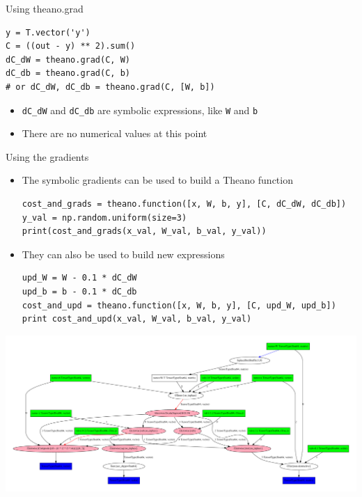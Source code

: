 \documentclass[a4paper,9pt]{beamer}
\begin{document}
\begin{frame}[fragile]{Using theano.grad}
  \begin{verbatim}
y = T.vector('y')
C = ((out - y) ** 2).sum()
dC_dW = theano.grad(C, W)
dC_db = theano.grad(C, b)
# or dC_dW, dC_db = theano.grad(C, [W, b])
  \end{verbatim}
  \begin{itemize}
    \item \verb|dC_dW| and \verb|dC_db| are symbolic expressions, like \verb|W| and \verb|b|
    \item There are no numerical values at this point
  \end{itemize}
\end{frame}

\begin{frame}[fragile]{Using the gradients}
  \begin{itemize}
    \item The symbolic gradients can be used to build a Theano function
      \begin{verbatim}
cost_and_grads = theano.function([x, W, b, y], [C, dC_dW, dC_db])
y_val = np.random.uniform(size=3)
print(cost_and_grads(x_val, W_val, b_val, y_val))
      \end{verbatim}
    \item They can also be used to build new expressions
      \begin{verbatim}
upd_W = W - 0.1 * dC_dW
upd_b = b - 0.1 * dC_db
cost_and_upd = theano.function([x, W, b, y], [C, upd_W, upd_b])
print cost_and_upd(x_val, W_val, b_val, y_val)
      \end{verbatim}
  \end{itemize}
\end{frame}

\begin{frame}
  \includegraphics[width=\textwidth]{pydotprint_cost_and_upd.pdf}
\end{frame}
\end{document}
